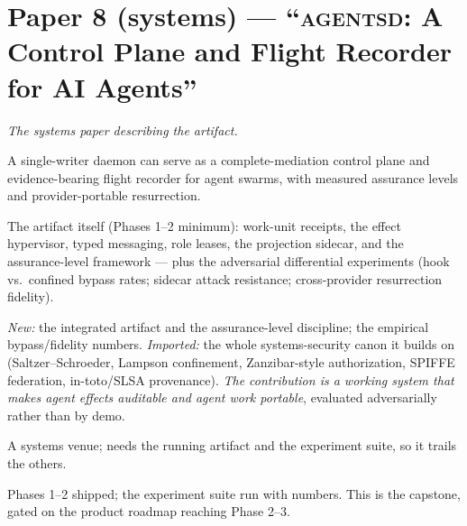 \documentclass[11pt,a4paper]{article}
\begin{document}
\section{Paper 8 (systems) --- ``\textsc{agentsd}: A Control Plane and Flight Recorder for AI Agents''}
\emph{The systems paper describing the artifact.}
\begin{description}[leftmargin=0em,style=unboxed]
\item[Thesis.] A single-writer daemon can serve as a complete-mediation control plane and evidence-bearing flight recorder for agent swarms, with measured assurance levels and provider-portable resurrection.
\item[Results.] The artifact itself (Phases 1--2 minimum): work-unit receipts, the effect hypervisor, typed messaging, role leases, the projection sidecar, and the assurance-level framework --- plus the adversarial differential experiments (hook vs.\ confined bypass rates; sidecar attack resistance; cross-provider resurrection fidelity).
\item[Novelty, honestly.] \emph{New:} the integrated artifact and the assurance-level discipline; the empirical bypass/fidelity numbers. \emph{Imported:} the whole systems-security canon it builds on (Saltzer--Schroeder, Lampson confinement, Zanzibar-style authorization, SPIFFE federation, in-toto/SLSA provenance). \emph{The contribution is a working system that makes agent effects auditable and agent work portable}, evaluated adversarially rather than by demo.
\item[Venue.] A systems venue; needs the running artifact and the experiment suite, so it trails the others.
\item[Gate.] Phases 1--2 shipped; the experiment suite run with numbers. This is the capstone, gated on the product roadmap reaching Phase 2--3.
\end{description}
\end{document}
